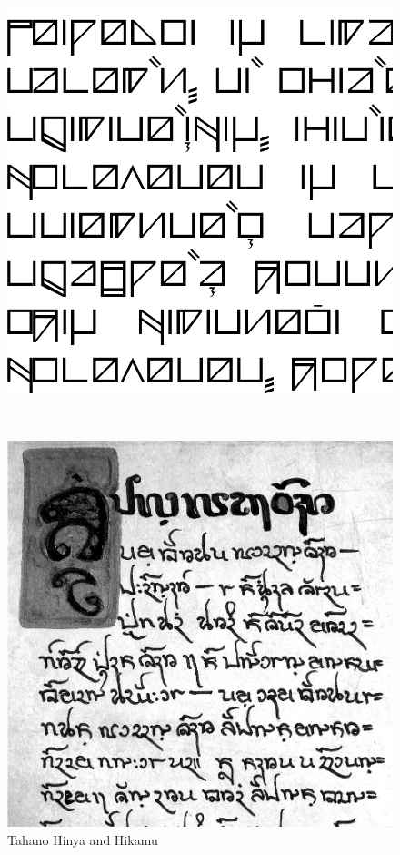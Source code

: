 \begin{figure}[tp]
\caption{Tahano Hinya and Hikamu}

\begin{minipage}{.5\linewidth}
\includegraphics[width=\linewidth]{images/hinya-300dpi-clip.png}
\label{fig:hinya}
\end{minipage}
~
\begin{minipage}{.5\linewidth}
\includegraphics[width=\linewidth]{images/tahano-300dpi-bw-clip.png}
\end{minipage}

\label{fig:hinyahikamu}
\end{figure}

